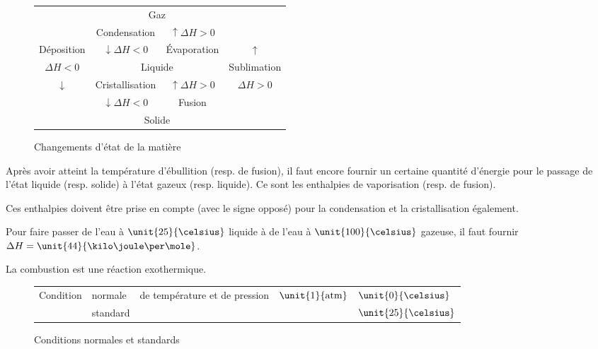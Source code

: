 \documentclass[11pt,a4paper,french]{article}
\begin{document}
\begin{figure}[h!]
	\begin{center}
		\begin{tabular}{|c|cc|c|}
			\cline{1-1} \cline{4-4}
			& \multicolumn{2}{c|}{Gaz} & \\
			\cline{2-3}
			\multicolumn{1}{|c}{} & Condensation & \multicolumn{1}{c}{$\uparrow \Delta H > 0$} & \\
			\multicolumn{1}{|c}{Déposition} & $\downarrow \Delta H < 0$ & \multicolumn{1}{c}{\'Evaporation} & $\uparrow$\\
			\cline{2-3}
			$\Delta H < 0$ & \multicolumn{2}{c|}{Liquide} & Sublimation\\
			\cline{2-3}
			\multicolumn{1}{|c}{$\downarrow$} & Cristallisation & \multicolumn{1}{c}{$\uparrow \Delta H > 0$} & $\Delta H > 0$\\
			\multicolumn{1}{|c}{} & $\downarrow \Delta H < 0$ & \multicolumn{1}{c}{Fusion} & \\
			\cline{2-3}
			& \multicolumn{2}{c|}{Solide} &\\
			\cline{1-1} \cline{4-4}
		\end{tabular}
	\end{center}
	\label{fig:state}
	\caption{Changements d'état de la matière}
\end{figure}

Après avoir atteint la température d'ébullition (resp. de fusion), il faut encore fournir un certaine quantité d'énergie pour le passage de l'état liquide (resp. solide) à l'état gazeux (resp. liquide).
Ce sont les enthalpies de vaporisation (resp. de fusion).

Ces enthalpies doivent être prise en compte (avec le signe opposé) pour la condensation et la cristallisation également.

Pour faire passer de l'eau à $\unit{25}{\celsius}$ liquide à de l'eau à $\unit{100}{\celsius}$ gazeuse, il faut fournir $\Delta H = \unit{44}{\kilo\joule\per\mole}$.

La combustion est une réaction exothermique.

\begin{figure}[h!]
	\begin{center}
		\begin{tabular}{|lllll|}
			\hline
			\multirow{2}{*}{Condition} & normale & \multirow{2}{*}{de température et de pression} & \multirow{2}{*}{$\unit{1}{\atm}$} & $\unit{0}{\celsius}$\\
			& standard & & & $\unit{25}{\celsius}$\\
			\hline
		\end{tabular}
	\end{center}
	\label{fig:cntp}
	\caption{Conditions normales et standards}
\end{figure}
\end{document}

